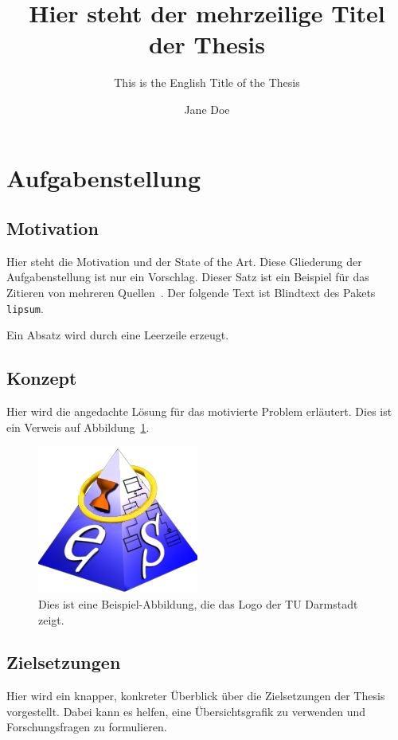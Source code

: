 \documentclass[
	ngerman,
	ruledheaders=section,%
	class=report,%
	thesis={type=master},%
	accentcolor=1b,%
	custommargins=false,%
	marginpar=false,%
	BCOR=12mm,%
	parskip=half-,%
	fontsize=11pt,%
	IMRAD=false,%
]{tudapub}
\begin{document}
\frontmatter


\title{Hier steht der mehrzeilige Titel der Thesis}
\subtitle{This is the English Title of the Thesis} %
\author[J. Doe]{Jane Doe}


\submissiondate{\today}
\examdate{\today}

\maketitle

\mainmatter

\chapter*{Aufgabenstellung}

\section*{Motivation}

Hier steht die Motivation und der State of the Art.
Diese Gliederung der Aufgabenstellung ist nur ein Vorschlag.
Dieser Satz ist ein Beispiel für das Zitieren von mehreren Quellen~\cite{Luthmann2017,Luthmann2019,Ruland2018}.
Der folgende Text ist Blindtext des Pakets \texttt{lipsum}.
\lipsum[1]

Ein Absatz wird durch eine Leerzeile erzeugt.
\lipsum[2]



\section*{Konzept}

Hier wird die angedachte Lösung für das motivierte Problem erläutert.
Dies ist ein Verweis auf Abbildung~\ref{fig:some-figure}.
\lipsum[3]

\begin{figure}[tp]
    \centering
    \includegraphics[width=.3\linewidth]{figures/es_logo_gross.jpg}
    \caption{Dies ist eine Beispiel-Abbildung, die das Logo der TU Darmstadt zeigt.}\label{fig:some-figure}
\end{figure}



\section*{Zielsetzungen}

Hier wird ein knapper, konkreter Überblick über die Zielsetzungen der Thesis vorgestellt.
Dabei kann es helfen, eine Übersichtsgrafik zu verwenden und Forschungsfragen zu formulieren.
\lipsum[4]





	
\end{document}
